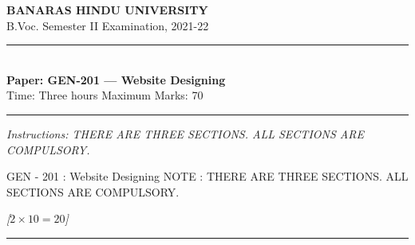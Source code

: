 \documentclass[11pt,a4paper]{article}
\newcommand{\pts}[1]{\hfill\textit{[#1]}}
\begin{document}
\begin{center}
  {\large\bfseries BANARAS HINDU UNIVERSITY}\\[2pt]
  {\normalsize B.Voc. Semester II Examination, 2021-22}\\[6pt]
  \rule{0.8\linewidth}{0.5pt}\\[6pt]
  {\large\bfseries Paper: GEN-201 --- Website Designing}\\[4pt]
  {\normalsize Time: Three hours \hfill Maximum Marks: 70}
\end{center}

\rule{\linewidth}{0.4pt}

\smallskip
\noindent\textit{Instructions: THERE ARE THREE SECTIONS. ALL SECTIONS ARE COMPULSORY.}

\bigskip

GEN - 201 : Website Designing
NOTE : THERE ARE THREE SECTIONS. ALL SECTIONS ARE COMPULSORY.

\bigskip{}\pts{$2 \times 10 = 20$}
\rule{\linewidth}{0.4pt}\smallskip
\end{document}
